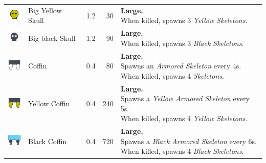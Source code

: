 \begin{table}[H]
\begin{tabular}{m{9mm}m{25mm}D{.}{.}{-1}rm{0.48\textwidth}}
        \includegraphics[height=7mm]{img/Icons/Attackers/Big Yellow Skull.png}        & \footnotesize{Big Yellow Skull}        & 1.2                 & 30               & \footnotesize{\textbf{Large.} \newline When killed, spawns 3 \emph{Yellow Skeletons}.}                                                                      \\
        \includegraphics[height=7mm]{img/Icons/Attackers/Big Black Skull.png}         & \footnotesize{Big black Skull}         & 1.2                 & 90               & \footnotesize{\textbf{Large.} \newline When killed, spawns 3 \emph{Black Skeletons}.}                                                                       \\
        \includegraphics[height=7mm]{img/Icons/Attackers/Coffin.png}                  & \footnotesize{Coffin}                  & 0.4                 & 80               & \footnotesize{\textbf{Large.} \newline Spawns an \emph{Armored Skeleton} every 4s. \newline When killed, spawns 4 \emph{Skeletons}.}                        \\
        \includegraphics[height=7mm]{img/Icons/Attackers/Yellow Coffin.png}           & \footnotesize{Yellow Coffin}           & 0.4                 & 240              & \footnotesize{\textbf{Large.} \newline Spawns a \emph{Yellow Armored Skeleton} every 5s. \newline When killed, spawns 4 \emph{Yellow Skeletons}.}           \\
        \includegraphics[height=7mm]{img/Icons/Attackers/Black Coffin.png}            & \footnotesize{Black Coffin}            & 0.4                 & 720              & \footnotesize{\textbf{Large.} \newline Spawns a \emph{Black Armored Skeleton} every 6s. \newline When killed, spawns 4 \emph{Black Skeletons}.}             \\

\end{tabular}
\end{table}
